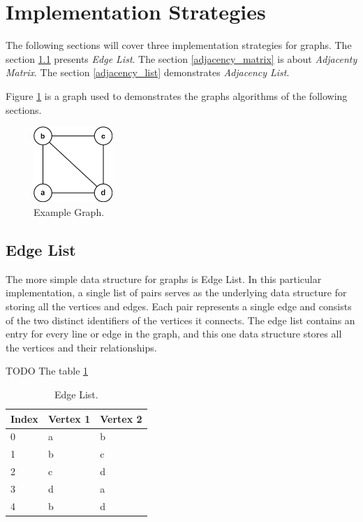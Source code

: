 \documentclass[a4paper]{article}
\begin{document}
    \section{Implementation Strategies}


    The following sections will cover three implementation strategies for graphs.
    The section \ref{edgelist} presents \emph{Edge List}.
    The section \ref{adjacency_matrix} is about \emph{Adjacenty Matrix}.
    The section \ref{adjacency_list} demonstrates \emph{Adjacency List}.

    Figure \ref{graph-algorithm-example} is a graph used to demonstrates
    the graphs algorithms of the following sections.

    \begin{figure}[H]
        \centering
        \includegraphics[width=30mm]{images/graphs-undirected.png}
        \vspace*{3mm}
        \caption{Example Graph.}
        \label{graph-algorithm-example}
    \end{figure}


    \subsection{Edge List} \label{edgelist}

    The more simple data structure for graphs is Edge List.
    In this particular implementation, a single list of pairs serves as the
    underlying data structure for storing all the vertices and edges. Each pair
    represents a single edge and consists of the two distinct identifiers of the
    vertices it connects. The edge list contains an entry for every line or edge
    in the graph, and this one data structure stores all the vertices and their
    relationships.

     TODO The table \ref{tab:edge-list}

    \begin{table}[H]
        \centering
        \caption{\label{tab:edge-list}Edge List.}
        \vspace*{10pt}
        \begin{tabular}{ |l|l|l| }
            \hline
            Index & Vertex 1 & Vertex 2 \\
            \hline
            0   & a & b \\
            \hline
            1   & b & c \\
            \hline
            2   & c & d \\
            \hline
            3   & d & a \\
            \hline
            4   & b & d \\
            \hline
        \end{tabular}
    \end{table}
\end{document}
